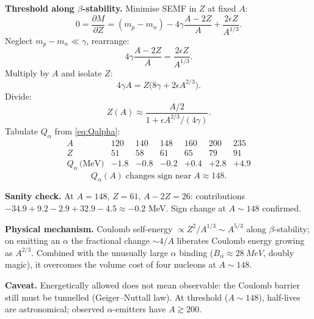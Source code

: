 \documentclass[11pt]{article}
\newcommand{\pd}[2]{\frac{\partial #1}{\partial #2}}
\begin{document}
\textbf{Threshold along $\beta$-stability.} Minimise SEMF in $Z$ at fixed $A$:
\[
0=\pd{M}{Z}=(m_p-m_n)-4\gamma\frac{A-2Z}{A}+\frac{2\epsilon Z}{A^{1/3}}.
\]
Neglect $m_p-m_n\ll \gamma$, rearrange:
\[
4\gamma\frac{A-2Z}{A}=\frac{2\epsilon Z}{A^{1/3}}.
\]
Multiply by $A$ and isolate $Z$:
\[
4\gamma A=Z\bigl(8\gamma+2\epsilon A^{2/3}\bigr).
\]
Divide:
\[
Z(A)\approx \frac{A/2}{1+\epsilon A^{2/3}/(4\gamma)}.
\]
Tabulate $Q_\alpha$ from \eqref{eq:Qalpha}:
\[
\begin{array}{c|c|c|c|c|c|c}
A & 120 & 140 & 148 & 160 & 200 & 235\\\hline
Z & 51 & 58 & 61 & 65 & 79 & 91\\
Q_\alpha\,\text{(MeV)} & -1.8 & -0.8 & -0.2 & +0.4 & +2.8 & +4.9
\end{array}
\]
\begin{equation}
\boxed{\;Q_\alpha(A)\;\text{changes sign near}\;A\approx 148.\;}
\label{eq:Aalpha}
\end{equation}

\textbf{Sanity check.} At $A=148$, $Z=61$, $A-2Z=26$: contributions $-34.9+9.2-2.9+32.9-4.5\approx -0.2$ MeV. Sign change at $A\sim 148$ confirmed.

\textbf{Physical mechanism.} Coulomb self-energy $\propto Z^{2}/A^{1/3}\sim A^{5/3}$ along $\beta$-stability; on emitting an $\alpha$ the fractional change $\sim 4/A$ liberates Coulomb energy growing as $A^{2/3}$. Combined with the unusually large $\alpha$ binding ($B_\alpha\approx\SI{28}{MeV}$, doubly magic), it overcomes the volume cost of four nucleons at $A\sim 148$.

\textbf{Caveat.} Energetically allowed does not mean observable: the Coulomb barrier still must be tunnelled (Geiger--Nuttall law). At threshold ($A\sim 148$), half-lives are astronomical; observed $\alpha$-emitters have $A\gtrsim 200$.
\end{document}
